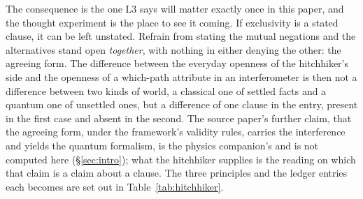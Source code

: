 
The consequence is the one L3 says will matter exactly once in this paper, and the thought experiment is the place to see it coming. If exclusivity is a stated clause, it can be left unstated. Refrain from stating the mutual negations and the alternatives stand open \emph{together}, with nothing in either denying the other: the agreeing form. The difference between the everyday openness of the hitchhiker's side and the openness of a which-path attribute in an interferometer is then not a difference between two kinds of world, a classical one of settled facts and a quantum one of unsettled ones, but a difference of one clause in the entry, present in the first case and absent in the second. The source paper's further claim, that the agreeing form, under the framework's validity rules, carries the interference and yields the quantum formalism, is the physics companion's \cite{AethusQuant} and is not computed here (\S\ref{sec:intro}); what the hitchhiker supplies is the reading on which that claim is a claim about a clause. The three principles and the ledger entries each becomes are set out in Table~\ref{tab:hitchhiker}.

